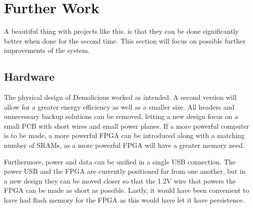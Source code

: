 \documentclass[../main/report.tex]{subfiles}
\begin{document}
\section{Further Work}

A beautiful thing with projects like this, is that they can be done significantly better when done for the second time.
This section will focus on possible further improvements of the system.

\subsection{Hardware}
The physical design of Demolicious worked as intended.
A second version will allow for a greater energy efficiency as well as a smaller size.
All headers and unnecessary backup solutions can be removed, letting a new design focus on a small PCB with short wires and small power planes.
If a more powerful computer is to be made, a more powerful FPGA can be introduced along with a matching number of SRAMs, as a more powerful FPGA will have a greater memory need.

Furthermore, power and data can be unified in a single USB connection.
The power USB and the FPGA are currently positioned far from one another, but in a new design they can be moved closer so that the 1.2V wire that powers the FPGA can be made as short as possible.
Lastly, it would have been convenient to have had flash memory for the FPGA as this would have let it have persistence.  
\end{document}
